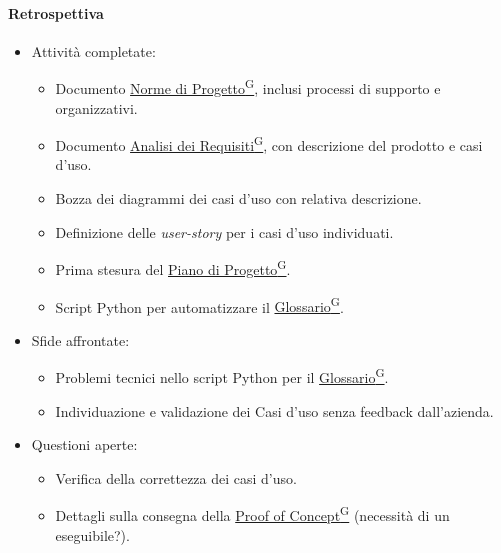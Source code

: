 \documentclass{article}
\begin{document}
                \paragraph{Retrospettiva}
                    \begin{itemize}
                        \item Attività completate:
                        \begin{itemize}
                            \item Documento \href{https://code7crusaders.github.io/docs/RTB/documentazione_interna/glossario.html#norme-di-progetto}{Norme di Progetto\textsuperscript{G}}, inclusi processi di supporto e organizzativi.
                            \item Documento \href{https://code7crusaders.github.io/docs/RTB/documentazione_interna/glossario.html#analisi-dei-requisiti}{Analisi dei Requisiti\textsuperscript{G}}, con descrizione del prodotto e casi d'uso.
                            \item Bozza dei diagrammi dei casi d'uso con relativa descrizione.
                            \item Definizione delle \textit{user-story} per i casi d'uso individuati.
                            \item Prima stesura del \href{https://code7crusaders.github.io/docs/RTB/documentazione_interna/glossario.html#piano-di-progetto}{Piano di Progetto\textsuperscript{G}}.
                            \item Script Python per automatizzare il \href{https://code7crusaders.github.io/docs/RTB/documentazione_interna/glossario.html#glossario}{Glossario\textsuperscript{G}}.
                        \end{itemize}
                        \item Sfide affrontate:
                        \begin{itemize}
                            \item Problemi tecnici nello script Python per il \href{https://code7crusaders.github.io/docs/RTB/documentazione_interna/glossario.html#glossario}{Glossario\textsuperscript{G}}.
                            \item Individuazione e validazione dei Casi d'uso senza feedback dall'azienda.
                        \end{itemize}
                        \item Questioni aperte:
                        \begin{itemize}
                            \item Verifica della correttezza dei casi d'uso.
                            \item Dettagli sulla consegna della \href{https://code7crusaders.github.io/docs/RTB/documentazione_interna/glossario.html#poc-proof-of-concept}{Proof of Concept\textsuperscript{G}} (necessità di un eseguibile?).
                        \end{itemize}
                    \end{itemize}
\end{document}
